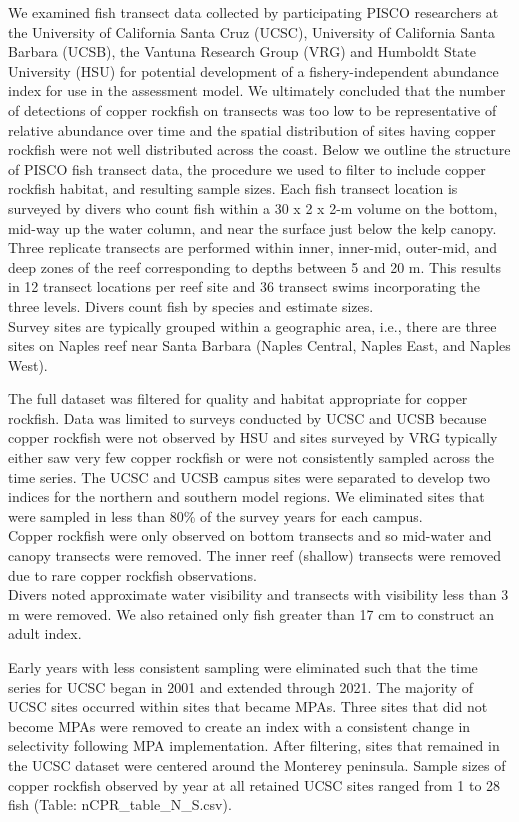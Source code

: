 \documentclass[11pt,
  english,
  letterpaper,
]{article}
\begin{document}
We examined fish transect data collected by participating PISCO researchers at the University of California Santa Cruz (UCSC), University of California Santa Barbara (UCSB), the Vantuna Research Group (VRG) and Humboldt State University (HSU) for potential development of a fishery-independent abundance index for use in the assessment model. We ultimately concluded that the number of detections of copper rockfish on transects was too low to be representative of relative abundance over time and the spatial distribution of sites having copper rockfish were not well distributed across the coast. Below we outline the structure of PISCO fish transect data, the procedure we used to filter to include copper rockfish habitat, and resulting sample sizes. Each fish transect location is surveyed by divers who count fish within a 30 x 2 x 2-m volume on the bottom, mid-way up the water column, and near the surface just below the kelp canopy. Three replicate transects are performed within inner, inner-mid, outer-mid, and deep zones of the reef corresponding to depths between 5 and 20 m. This results in 12 transect locations per reef site and 36 transect swims incorporating the three levels. Divers count fish by species and estimate sizes.\\
Survey sites are typically grouped within a geographic area, i.e., there are three sites on Naples reef near Santa Barbara (Naples Central, Naples East, and Naples West).

The full dataset was filtered for quality and habitat appropriate for copper rockfish. Data was limited to surveys conducted by UCSC and UCSB because copper rockfish were not observed by HSU and sites surveyed by VRG typically either saw very few copper rockfish or were not consistently sampled across the time series. The UCSC and UCSB campus sites were separated to develop two indices for the northern and southern model regions. We eliminated sites that were sampled in less than 80\% of the survey years for each campus.\\
Copper rockfish were only observed on bottom transects and so mid-water and canopy transects were removed. The inner reef (shallow) transects were removed due to rare copper rockfish observations.\\
Divers noted approximate water visibility and transects with visibility less than 3 m were removed. We also retained only fish greater than 17 cm to construct an adult index.

Early years with less consistent sampling were eliminated such that the time series for UCSC began in 2001 and extended through 2021. The majority of UCSC sites occurred within sites that became MPAs. Three sites that did not become MPAs were removed to create an index with a consistent change in selectivity following MPA implementation. After filtering, sites that remained in the UCSC dataset were centered around the Monterey peninsula. Sample sizes of copper rockfish observed by year at all retained UCSC sites ranged from 1 to 28 fish (Table: nCPR\_table\_N\_S.csv).
\end{document}
